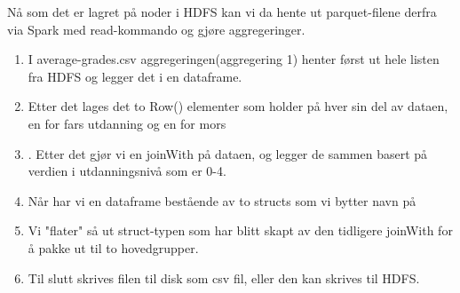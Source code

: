 Nå som det er lagret på noder i HDFS kan vi da hente ut parquet-filene derfra via Spark med read-kommando og gjøre aggregeringer.

\begin{enumerate}
    \item I average-grades.csv aggregeringen(aggregering 1) henter først ut hele listen fra HDFS og legger det i en dataframe.
    \item Etter det lages det to Row() elementer som holder på hver sin del av dataen, en for fars utdanning og en for mors
    \item . Etter det gjør vi en joinWith på dataen, og legger de sammen basert på verdien i utdanningsnivå som er 0-4.
    \item Når har vi en dataframe bestående av to structs som vi bytter navn på
    \item Vi "flater" så ut struct-typen som har blitt skapt av den tidligere joinWith for å pakke ut til to hovedgrupper.
    \item Til slutt skrives filen til disk som csv fil, eller den kan skrives til HDFS.
  \end{enumerate}
